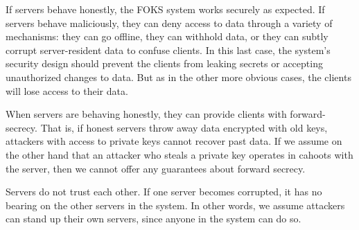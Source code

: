 If servers behave honestly, the FOKS system works securely as expected.  If
servers behave maliciously, they can deny access to data through a variety of
mechanisms: they can go offline, they can withhold data, or they can subtly
corrupt server-resident data to confuse clients. In this last case, the system's
security design should prevent the clients from leaking secrets or accepting
unauthorized changes to data. But as in the other more obvious cases, the
clients will lose access to their data.

When servers are behaving honestly, they can provide clients with
forward-secrecy. That is, if honest servers throw away data encrypted with old
keys, attackers with access to private keys cannot recover past data.  If
we assume on the other hand that an attacker who steals a private key operates
in cahoots with the server, then we cannot offer any guarantees about forward
secrecy.

Servers do not trust each other. If one server becomes corrupted, it has no
bearing on the other servers in the system. In other words, we assume attackers
can stand up their own servers, since anyone in the system can do so.

